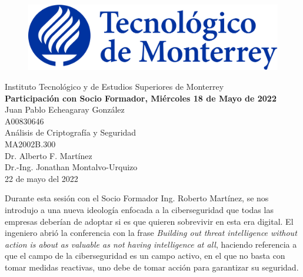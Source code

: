 \documentclass[12pt]{article}
\begin{document}
    \begin{titlepage}
        \begin{center}
            \begin{figure}
                \centering
                \includegraphics[scale=0.13]{../../logo_itesm.png}\\ %
            \end{figure}
        \vspace{5cm}
        \LARGE{Instituto Tecnológico y de Estudios Superiores de Monterrey}\\
        \fontsize{12}{14}\selectfont
        \vspace{1cm}
        \textbf{Participación con Socio Formador, Miércoles 18 de Mayo de 2022}\\ %
        \vspace{0.7cm}
        Juan Pablo Echeagaray González\\ %
        \vspace{0.2cm}
        A00830646\\ %
        \vspace{0.7cm}
        Análisis de Criptografía y Seguridad\\ %
        \vspace{0.2cm}
        MA2002B.300\\ %
        \vspace{0.2cm}
        Dr. Alberto F. Martínez \\ %
        \vspace{0.2cm}
        Dr.-Ing. Jonathan Montalvo-Urquizo \\
        \vspace{0.7cm}
        22 de mayo del 2022 \\ %
        \end{center}
    \end{titlepage}

    Durante esta sesión con el Socio Formador Ing. Roberto Martínez, se nos introdujo a una nueva ideología enfocada a la ciberseguridad que todas las empresas deberían de adoptar si es que quieren sobrevivir en esta era digital. El ingeniero abrió la conferencia con la frase \emph{Building out threat intelligence without action is about as valuable as not having intelligence at all}, haciendo referencia a que el campo de la ciberseguridad es un campo activo, en el que no basta con tomar medidas reactivas, uno debe de tomar acción para garantizar su seguridad.
\end{document}
